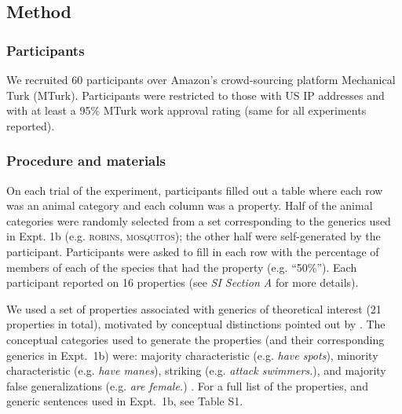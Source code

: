 \documentclass[10pt,letterpaper]{article}
\begin{document}
\subsection*{Method}

\subsubsection*{Participants}
We recruited 60 participants over Amazon's crowd-sourcing platform Mechanical Turk (MTurk).  
Participants were restricted to those with US IP addresses and with at least a 95\% MTurk work approval rating (same for all experiments reported). 

\subsubsection*{Procedure and materials}
On each trial of the experiment, participants filled out a table where each row was an animal category and each column was a property. 
Half of the animal categories were randomly selected from a set corresponding to the generics used in Expt. 1b (e.g. \textsc{robins, mosquitos}); the other half were self-generated by the participant.
Participants were asked to fill in each row with the percentage of members of each of the species that had the property (e.g. ``50\%'').
Each participant reported on 16 properties (see {\it SI Section A} for more details).
 
 We used a set of properties associated with generics of theoretical interest (21 properties in total), motivated by conceptual distinctions pointed out by . 
The conceptual categories used to generate the properties (and their corresponding generics in Expt.~1b) were: majority characteristic (e.g. \emph{have spots}), minority characteristic (e.g. \emph{have manes}), striking (e.g. \emph{attack swimmers.}), and majority false generalizations (e.g. \emph{are female.}) \cite{Prasada2013}.
For a full list of the properties, and generic sentences used in Expt.~1b, see Table S1.
 
\end{document}
